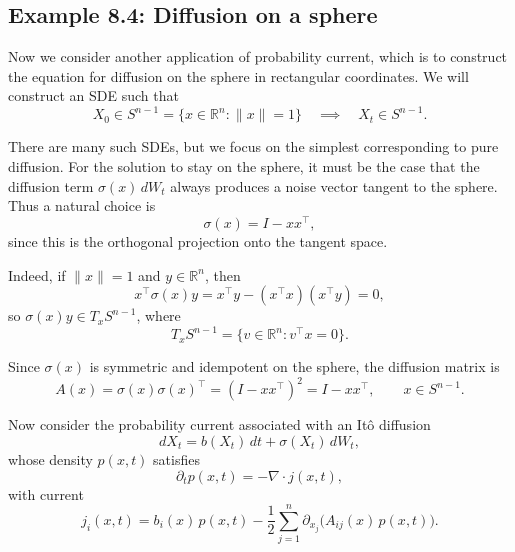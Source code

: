 \documentclass[11pt]{article}
\begin{document}
\subsection*{Example 8.4: Diffusion on a sphere}

Now we consider another application of probability current, which is to construct the equation for diffusion on the sphere in rectangular coordinates. 
We will construct an SDE such that
\begin{equation}
X_0 \in S^{n-1} = \{x \in \mathbb R^n : \|x\| = 1\}
\quad \implies \quad
X_t \in S^{n-1}.
\end{equation}

There are many such SDEs, but we focus on the simplest corresponding to pure diffusion. 
For the solution to stay on the sphere, it must be the case that the diffusion term $\sigma(x)\,dW_t$ always produces a noise vector tangent to the sphere. 
Thus a natural choice is 
\begin{equation}
\sigma(x) = I - xx^\top,
\end{equation}
since this is the orthogonal projection onto the tangent space.

Indeed, if $\|x\|=1$ and $y\in\mathbb R^n$, then
\begin{equation}
x^\top \sigma(x) y 
= x^\top y - (x^\top x)(x^\top y)
= 0,
\end{equation}
so $\sigma(x)y \in T_x S^{n-1}$, where
\begin{equation}
T_x S^{n-1} = \{ v \in \mathbb R^n : v^\top x = 0 \}.
\end{equation}

Since $\sigma(x)$ is symmetric and idempotent on the sphere, the diffusion matrix is
\begin{equation}
A(x) = \sigma(x)\sigma(x)^\top 
= (I - xx^\top)^2 
= I - xx^\top,
\qquad x \in S^{n-1}.
\end{equation}

Now consider the probability current associated with an It\^o diffusion
\begin{equation}
dX_t = b(X_t)\,dt + \sigma(X_t)\,dW_t,
\end{equation}
whose density $p(x,t)$ satisfies
\begin{equation}
\partial_t p(x,t) = -\nabla \cdot j(x,t),
\end{equation}
with current
\begin{equation}
j_i(x,t)
=
b_i(x)\,p(x,t)
-
\frac12 \sum_{j=1}^n
\partial_{x_j}\!\big( A_{ij}(x)\,p(x,t) \big).
\end{equation}
\end{document}
